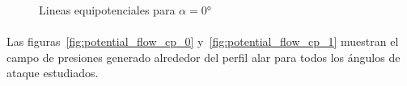 \documentclass[letterpaper, openright, 12pt]{book}
\begin{document}
    \begin{figure}[htbp!]
        \centering
        \caption{Lineas equipotenciales para $\alpha = 0\si{\degree}$}
        \label{fig:potential_flow_potential}
    \end{figure}

    \paragraph*{}
    Las figuras~\ref{fig:potential_flow_cp_0} y~\ref{fig:potential_flow_cp_1}
    muestran el campo de presiones generado alrededor del perfil alar para todos
    los ángulos de ataque estudiados.
\end{document}
